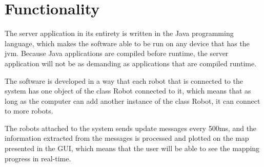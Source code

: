 \section{Functionality}
The server application in its entirety is written in the Java programming language, which makes the software able to be run on any device that has the \acrlong{jvm}. Because Java applications are compiled before runtime, the server application will not be as demanding as applications that are compiled runtime. 

The software is developed in a way that each robot that is connected to the system has one object of the class Robot connected to it, which means that as long as the computer can add another instance of the class Robot, it can connect to more robots. 

The robots attached to the system sends update messages every 500ms, and the information extracted from the messages is processed and plotted on the map presented in the GUI, which means that the user will be able to see the mapping progress in real-time.
